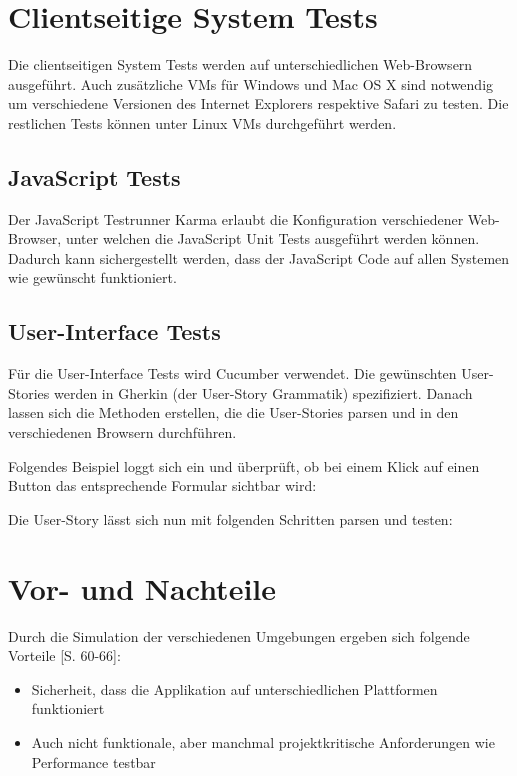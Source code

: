 \documentclass[a4paper,bibtotoc,oneside]{scrbook}
\begin{document}
\section{Clientseitige System Tests}
Die clientseitigen System Tests werden auf unterschiedlichen Web-Browsern ausgeführt. Auch zusätzliche VMs für Windows und Mac OS X sind notwendig um verschiedene Versionen des Internet Explorers respektive Safari zu testen. Die restlichen Tests können unter Linux VMs durchgeführt werden.

\subsection{JavaScript Tests}
Der JavaScript Testrunner Karma erlaubt die Konfiguration verschiedener Web-Browser, unter welchen die JavaScript Unit Tests ausgeführt werden können. Dadurch kann sichergestellt werden, dass der JavaScript Code auf allen Systemen wie gewünscht funktioniert.

\subsection{User-Interface Tests}
Für die User-Interface Tests wird Cucumber verwendet. Die gewünschten User-Stories werden in Gherkin (der User-Story Grammatik) spezifiziert. Danach lassen sich die Methoden erstellen, die die User-Stories parsen und in den verschiedenen Browsern durchführen.

Folgendes Beispiel loggt sich ein und überprüft, ob bei einem Klick auf einen Button das entsprechende Formular sichtbar wird:



Die User-Story lässt sich nun mit folgenden Schritten parsen und testen:



\section{Vor- und Nachteile}
Durch die Simulation der verschiedenen Umgebungen ergeben sich folgende Vorteile \cite{test_large_systems}[S. 60-66]:

\begin{itemize}
  \item Sicherheit, dass die Applikation auf unterschiedlichen Plattformen funktioniert
  \item Auch nicht funktionale, aber manchmal projektkritische Anforderungen wie Performance testbar
\end{itemize}
\end{document}
